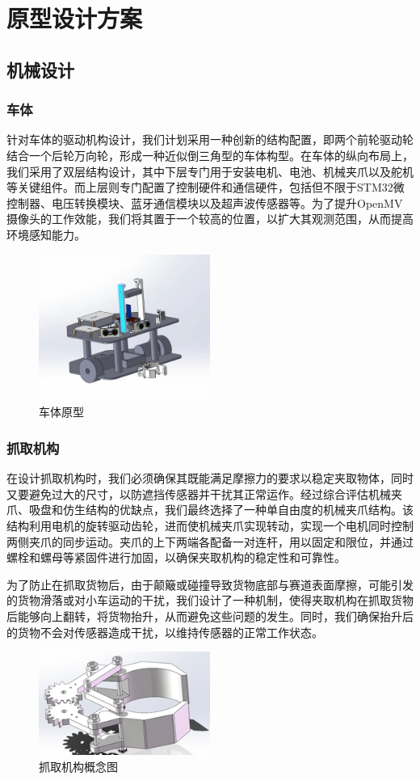 \documentclass{report}
\begin{document}
\chapter{原型设计方案}

\section{机械设计}
\subsection{车体}
\label{subsec:label}
针对车体的驱动机构设计，我们计划采用一种创新的结构配置，即两个前轮驱动轮结合一个后轮万向轮，形成一种近似倒三角型的车体构型。在车体的纵向布局上，我们采用了双层结构设计，其中下层专门用于安装电机、电池、机械夹爪以及舵机等关键组件。而上层则专门配置了控制硬件和通信硬件，包括但不限于STM32微控制器、电压转换模块、蓝牙通信模块以及超声波传感器等。为了提升OpenMV摄像头的工作效能，我们将其置于一个较高的位置，以扩大其观测范围，从而提高环境感知能力。
\begin{figure}[ht]
  \centering
  \includegraphics[width=0.5\textwidth]{figures/body.jpg}
  \caption{车体原型}
\end{figure}
\newpage
\subsection{抓取机构}
在设计抓取机构时，我们必须确保其既能满足摩擦力的要求以稳定夹取物体，同时又要避免过大的尺寸，以防遮挡传感器并干扰其正常运作。经过综合评估机械夹爪、吸盘和仿生结构的优缺点，我们最终选择了一种单自由度的机械夹爪结构。该结构利用电机的旋转驱动齿轮，进而使机械夹爪实现转动，实现一个电机同时控制两侧夹爪的同步运动。夹爪的上下两端各配备一对连杆，用以固定和限位，并通过螺栓和螺母等紧固件进行加固，以确保夹取机构的稳定性和可靠性。

为了防止在抓取货物后，由于颠簸或碰撞导致货物底部与赛道表面摩擦，可能引发的货物滑落或对小车运动的干扰，我们设计了一种机制，使得夹取机构在抓取货物后能够向上翻转，将货物抬升，从而避免这些问题的发生。同时，我们确保抬升后的货物不会对传感器造成干扰，以维持传感器的正常工作状态。
\begin{figure}[ht]
  \centering
  \includegraphics[width=0.5\textwidth]{figures/pickup.png}
  \caption{抓取机构概念图 }
\end{figure}
\newpage
\end{document}
